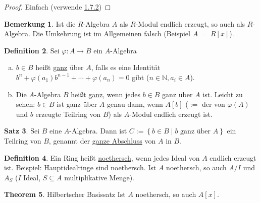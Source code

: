 \documentclass[
twoside=semi,
fontsize=12,
DIV=12, 
cleardoublepage=current,
leqno,
headings=optiontoheadandtoc, 
toc=idx
]{scrbook}
\newcommand{\N}{\mathbb{N}}
\newcommand{\set}[1]{\left\{ #1 \right\}}
\newcommand{\emphasize}[1]{\underline{#1}}
\theoremstyle{definition}
\newtheorem{definition}{Definition}[section]
\newtheorem{bemerkung}[definition]{Bemerkung}
\newtheorem{satz}[definition]{Satz}
\newtheorem{theorem}[definition]{Theorem}
\begin{document}
	\begin{proof}
		Einfach (verwende \hyperref[1.1.7.2]{1.7.2})
	\end{proof}

	\begin{bemerkung}\label{1.1.9}\hfill\newline
		Ist die $R$-Algebra $A$ als $R$-Modul endlich erzeugt, so auch als $R$-Algebra. Die Umkehrung ist im Allgemeinen falsch (Beispiel $A~=~R[x]$).
	\end{bemerkung}

	\begin{definition}\label{1.1.10}\hfill\newline
		Sei $\varphi: A \to B$ ein $A$-Algebra
		\begin{enumerate}[(a)]
			\item $b \in B$ hei\ss t \emphasize{ganz} \"uber $A$, falls es eine Identit\"at $b^n+\varphi(a_1)b^{n-1} + \cdots + \varphi(a_n) = 0$ gibt ($n \in \N, a_i \in A$).
			
			\item Die $A$-Algebra $B$ hei\ss t \emphasize{ganz}, wenn jedes $b \in B$ ganz \"uber $A$ ist.\newline
			Leicht zu sehen: $b \in B$ ist ganz \"uber $A$ genau dann, wenn $A[b]$ ($:=$ der von $\varphi(A)$ und $b$ erzeugte Teilring von $B$) als $A$-Modul endlich erzeugt ist.
		\end{enumerate}
	\end{definition}

	\begin{satz}\label{1.1.11}\hfill\newline
		Sei $B$ eine $A$-Algebra. Dann ist $C:= \set{b \in B\mid b \textrm{ ganz \"uber } A }$ ein Teilring von $B$, genannt der \emphasize{ganze Abschluss} von $A$ in $B$.
	\end{satz}

	\begin{definition}\label{1.1.12}\hfill\newline
		Ein Ring hei\ss t \emphasize{noethersch}, wenn jedes Ideal von $A$ endlich erzeugt ist. \newline
		Beispiel: Hauptidealringe sind noethersch. Ist $A$ noethersch, so auch $A/I$ und $A_S$ ($I$ Ideal, $S \subseteq A$ multiplikative Menge).
	\end{definition}

	\begin{theorem}\label{1.1.13} Hilbertscher Basissatz\newline
		Ist $A$ noethersch, so auch $A[x]$.
	\end{theorem}
\end{document}
